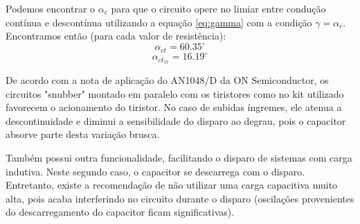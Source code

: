 \documentclass{article}
\begin{document}
Podemos encontrar o $\alpha_c$ para que o circuito opere no limiar entre condução contínua e descontínua utilizando a equação \ref{eq:gamma} com a condição $\gamma = \alpha_c$. Encontramos então (para cada valor de resistência):
\begin{equation}
\alpha_{ct} = 60.35^\circ
\end{equation}
\begin{equation}
\alpha_{{ct}_{57}} = 16.19^\circ
\end{equation}

De acordo com a nota de aplicação do AN1048/D da ON Semiconductor, os circuitos "snubber" montado em paralelo com os tiristores como no kit utilizado favorecem o acionamento do tiristor. No caso de subidas íngremes, ele atenua a descontinuidade e diminui a sensibilidade do disparo ao degrau, pois o capacitor absorve parte desta variação brusca. 

Também possui outra funcionalidade, facilitando o disparo de sistemas com carga indutiva. Neste segundo caso, o capacitor se descarrega com o disparo. Entretanto, existe a recomendação de não utilizar uma carga capacitiva muito alta, pois acaba interferindo no circuito durante o disparo (oscilações provenientes do descarregamento do capacitor ficam significativas).



\end{document}
